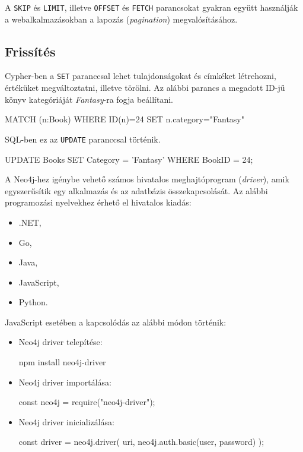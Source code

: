 A \texttt{SKIP} és \texttt{LIMIT}, illetve \texttt{OFFSET} és \texttt{FETCH} parancsokat gyakran együtt használják a webalkalmazásokban a lapozás (\textit{pagination}) megvalósításához.

\subsection{Frissítés}
Cypher-ben a \texttt{SET} paranccsal lehet tulajdonságokat és címkéket létrehozni, értéküket megváltoztatni, illetve törölni. Az alábbi parancs a megadott ID-jű könyv kategóriáját \textit{Fantasy}-ra fogja beállítani.
\begin{java}
MATCH (n:Book) 
WHERE ID(n)=24
SET n.category="Fantasy"
\end{java}
SQL-ben ez az \texttt{UPDATE} paranccsal történik.
\begin{java}
UPDATE Books
SET Category = 'Fantasy'
WHERE BookID = 24;
\end{java}



A Neo4j-hez igénybe vehető számos hivatalos meghajtóprogram (\textit{driver}), amik egyszerűsítik egy alkalmazás és az adatbázis összekapcsolását. Az alábbi programozási nyelvekhez érhető el hivatalos kiadás:
\begin{itemize}
    \item .NET,
    \item Go,
    \item Java,
    \item JavaScript,
    \item Python.
\end{itemize}
JavaScript esetében a kapcsolódás az alábbi módon történik:
\begin{itemize}
\item Neo4j driver telepítése:
\begin{java}
npm install neo4j-driver
\end{java}
\item Neo4j driver importálása: 
\begin{java}
const neo4j = require("neo4j-driver");
\end{java}
\item Neo4j driver inicializálása:
\begin{java}
const driver = neo4j.driver(
  uri,
  neo4j.auth.basic(user, password)
);
\end{java}
\end{itemize}

